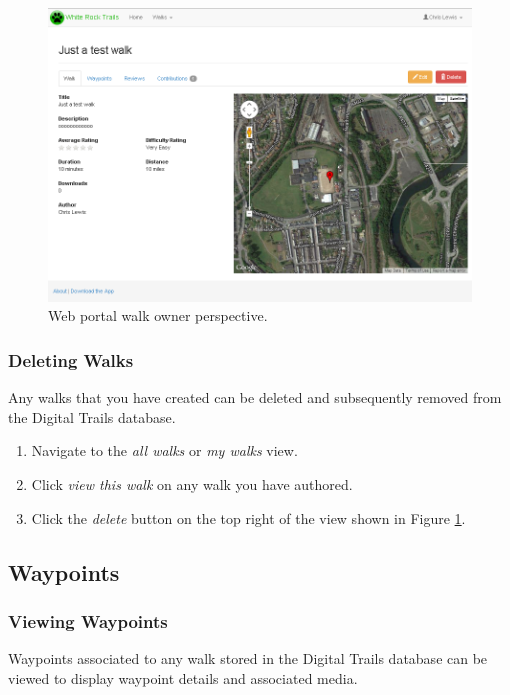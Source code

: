 \documentclass[11pt,a4paper]{report}
\begin{document}
\begin{figure}[H]
\centering
\includegraphics[width=0.8\linewidth]{./img/webportal/walk-info}
\caption{Web portal walk owner perspective.}
\label{fig:walk-info-guide}
\end{figure}

\subsubsection{Deleting Walks}

Any walks that you have created can be deleted and subsequently removed from the Digital Trails database.

\begin{enumerate}
\item Navigate to the \emph{all walks} or \emph{my walks} view.
\item Click \emph{view this walk} on any walk you have authored.
\item Click the \emph{delete} button on the top right of the view shown in Figure \ref{fig:walk-info-guide}.
\end{enumerate}

\subsection{Waypoints}

\subsubsection{Viewing Waypoints}

Waypoints associated to any walk stored in the Digital Trails database can be viewed to display waypoint details and associated media.
\end{document}
